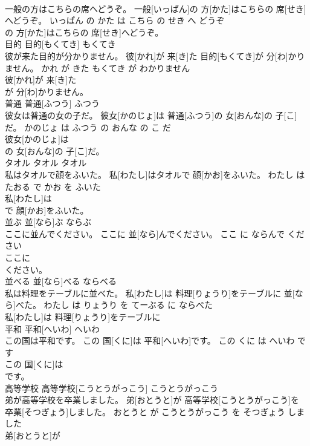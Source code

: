 \documentclass[8pt]{extreport}
\begin{document}
\begin{CJK}{UTF8}{min}
\\	一般の方はこちらの席へどうぞ。	一般[いっぱん]の 方[かた]はこちらの 席[せき]へどうぞ。	いっぱん の かた は こちら の せき へ どうぞ	
\\	の 方[かた]はこちらの 席[せき]へどうぞ。		
\\	目的	目的[もくてき]	もくてき	
\\	彼が来た目的が分かりません。	彼[かれ]が 来[き]た 目的[もくてき]が 分[わ]かりません。	かれ が きた もくてき が わかりません	
\\	彼[かれ]が 来[き]た
\\	が 分[わ]かりません。		
\\	普通	普通[ふつう]	ふつう	
\\	彼女は普通の女の子だ。	彼女[かのじょ]は 普通[ふつう]の 女[おんな]の 子[こ]だ。	かのじょ は ふつう の おんな の こ だ	
\\	彼女[かのじょ]は
\\	の 女[おんな]の 子[こ]だ。		
\\	タオル	タオル	タオル	
\\	私はタオルで顔をふいた。	私[わたし]はタオルで 顔[かお]をふいた。	わたし は たおる で かお を ふいた	
\\	私[わたし]は
\\	で 顔[かお]をふいた。		
\\	並ぶ	並[なら]ぶ	ならぶ	
\\	ここに並んでください。	ここに 並[なら]んでください。	ここ に ならんで ください	
\\	ここに
\\	ください。		
\\	並べる	並[なら]べる	ならべる	
\\	私は料理をテーブルに並べた。	私[わたし]は 料理[りょうり]をテーブルに 並[なら]べた。	わたし は りょうり を てーぶる に ならべた	
\\	私[わたし]は 料理[りょうり]をテーブルに
\\	平和	平和[へいわ]	へいわ	
\\	この国は平和です。	この 国[くに]は 平和[へいわ]です。	この くに は へいわ です	
\\	この 国[くに]は
\\	です。		
\\	高等学校	高等学校[こうとうがっこう]	こうとうがっこう	
\\	弟が高等学校を卒業しました。	弟[おとうと]が 高等学校[こうとうがっこう]を 卒業[そつぎょう]しました。	おとうと が こうとうがっこう を そつぎょう しました	
\\	弟[おとうと]が

\end{CJK}
\end{document}
